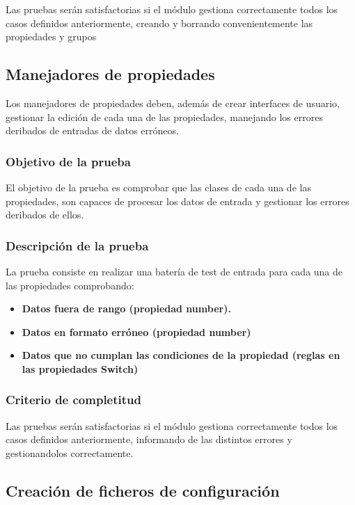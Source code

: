Las pruebas serán satisfactorias si el módulo gestiona correctamente todos los casos definidos anteriormente, creando y borrando convenientemente las propiedades y grupos


\bigskip
\subsection{Manejadores de propiedades}

Los manejadores de propiedades deben, además de crear interfaces de usuario, gestionar la edición de cada una de las propiedades, manejando los errores deribados de entradas de datos erróneos.

\subsubsection{Objetivo de la prueba}

El objetivo de la prueba es comprobar que las clases de cada una de las propiedades, son capaces de procesar los datos de entrada y gestionar los errores deribados de ellos.

\subsubsection{Descripción de la prueba}

La prueba consiste en realizar una batería de test de entrada para cada una de las propiedades comprobando:

\begin{itemize}
  \item \textbf{Datos fuera de rango (propiedad number).}
  \item \textbf{Datos en formato erróneo (propiedad number)}
  \item \textbf{Datos que no cumplan las condiciones de la propiedad (reglas en las propiedades Switch)}  
\end{itemize}

\subsubsection{Criterio de completitud}

Las pruebas serán satisfactorias si el módulo gestiona correctamente todos los casos definidos anteriormente, informando de las distintos errores y gestionandolos correctamente.

\bigskip
\subsection{Creación de ficheros de configuración}

